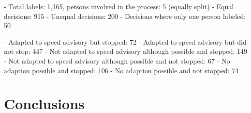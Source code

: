 - Total labels: 1,165, persons involved in the process: 5 (equally split)
- Equal decisions: 915
- Unequal decisions: 200
- Decisions where only one person labeled: 50

- Adapted to speed advisory but stopped: 72
- Adapted to speed advisory but did not stop: 447
- Not adapted to speed advisory although possible and stopped: 149
- Not adapted to speed advisory although possible and not stopped: 67
- No adaption possible and stopped: 106
- No adaption possible and not stopped: 74

\section{Conclusions}
